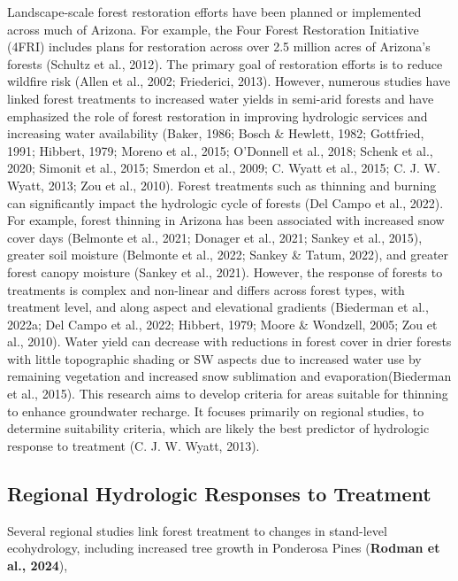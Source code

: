 \documentclass[
]{agujournal2019}
\begin{document}
Landscape-scale forest restoration efforts have been planned or
implemented across much of Arizona. For example, the Four Forest
Restoration Initiative (4FRI) includes plans for restoration across over
2.5 million acres of Arizona's forests (Schultz et al., 2012). The
primary goal of restoration efforts is to reduce wildfire risk (Allen et
al., 2002; Friederici, 2013). However, numerous studies have linked
forest treatments to increased water yields in semi-arid forests and
have emphasized the role of forest restoration in improving hydrologic
services and increasing water availability (Baker, 1986; Bosch \&
Hewlett, 1982; Gottfried, 1991; Hibbert, 1979; Moreno et al., 2015;
O'Donnell et al., 2018; Schenk et al., 2020; Simonit et al., 2015;
Smerdon et al., 2009; C. Wyatt et al., 2015; C. J. W. Wyatt, 2013; Zou
et al., 2010). Forest treatments such as thinning and burning can
significantly impact the hydrologic cycle of forests (Del Campo et al.,
2022). For example, forest thinning in Arizona has been associated with
increased snow cover days (Belmonte et al., 2021; Donager et al., 2021;
Sankey et al., 2015), greater soil moisture (Belmonte et al., 2022;
Sankey \& Tatum, 2022), and greater forest canopy moisture (Sankey et
al., 2021). However, the response of forests to treatments is complex
and non-linear and differs across forest types, with treatment level,
and along aspect and elevational gradients (Biederman et al., 2022a; Del
Campo et al., 2022; Hibbert, 1979; Moore \& Wondzell, 2005; Zou et al.,
2010). Water yield can decrease with reductions in forest cover in drier
forests with little topographic shading or SW aspects due to increased
water use by remaining vegetation and increased snow sublimation and
evaporation(Biederman et al., 2015). This research aims to develop
criteria for areas suitable for thinning to enhance groundwater
recharge. It focuses primarily on regional studies, to determine
suitability criteria, which are likely the best predictor of hydrologic
response to treatment (C. J. W. Wyatt, 2013).

\subsection{Regional Hydrologic Responses to
Treatment}\label{regional-hydrologic-responses-to-treatment}

Several regional studies link forest treatment to changes in stand-level
ecohydrology, including increased tree growth in Ponderosa Pines
(\textbf{Rodman et al., 2024}),
\end{document}
